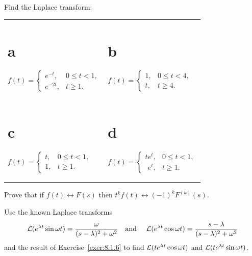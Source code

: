 \begin{exerciselist}
  \item\label{exer:8.1.5} Find the Laplace transform:

  \begin{tabular}[t]{@{}p{168pt}@{}p{168pt}}
    \part{a} $f(t)=\left\{\begin{array}{rl}e^{-t},& 0\le t<1,\\e^{-2t},&t\ge1.\end{array}\right.$ & \part{b} $f(t)=\left\{\begin{array}{rl}1,&0\le t< 4,\\t,&t\ge4.\end{array}\right.$                    \\[2\jot]
    \part{c} $f(t)=\left\{\begin{array}{rl}t,&0\le t<1,\\1,&t\ge1.\end{array}\right.$             & \part{d} $f(t)=\left\{\begin{array}{rl}te^{t},&0\le t<1,\\\phantom{t}e^{t},&t\ge1.\end{array}\right.$
  \end{tabular}

  \item\label{exer:8.1.6} Prove that if $f(t)\leftrightarrow F(s)$ then
        $t^{k}f(t)\leftrightarrow (-1)^{k}F^{(k)}(s)$. 

  \item\label{exer:8.1.7} Use the known Laplace transforms
  \[
    {\cal L}(e^{\lambda t}\sin\omega t)=\frac{\omega}{(s-\lambda)^{2}+\omega^{2}}\quad\mbox{and }\quad{\cal L}(e^{\lambda t}\cos\omega t)=\frac{s-\lambda}{(s-\lambda)^{2}+\omega^{2}}
  \]
  and the result of Exercise~\ref{exer:8.1.6} to find ${\cal L}(te^{\lambda t}\cos\omega t)$ and
  ${\cal L}(te^{\lambda t}\sin\omega t)$.


\end{exerciselist}
